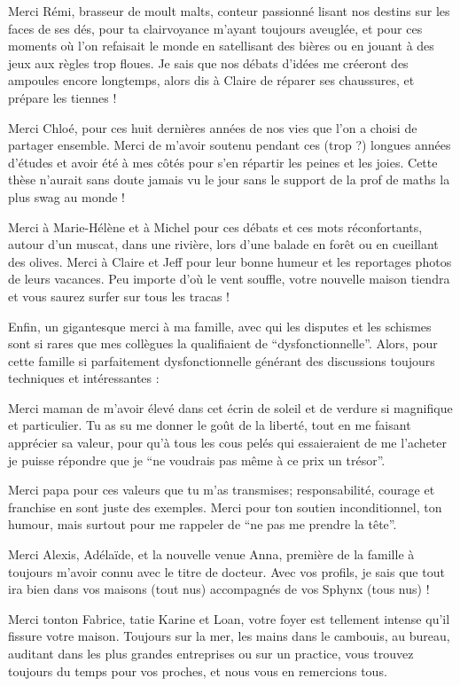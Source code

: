 \documentclass[english,a4paper,11pt,twoside]{StyleThese}
\begin{document}
Merci Rémi, brasseur de moult malts, conteur passionné lisant nos destins sur les faces de ses dés, pour ta clairvoyance m'ayant toujours aveuglée, et pour ces moments où l'on refaisait le monde en satellisant des bières ou en jouant à des jeux aux règles trop floues. Je sais que nos débats d'idées me créeront des ampoules encore longtemps, alors dis à Claire de réparer ses chaussures, et prépare les tiennes !

\medskip

Merci Chloé, pour ces huit dernières années de nos vies que l'on a choisi de partager ensemble. Merci de m'avoir soutenu pendant ces (trop ?) longues années d'études et avoir été à mes côtés pour s'en répartir les peines et les joies. Cette thèse n'aurait sans doute jamais vu le jour sans le support de la prof de maths la plus swag au monde !

Merci à Marie-Hélène et à Michel pour ces débats et ces mots réconfortants, autour d'un muscat, dans une rivière, lors d'une balade en forêt ou en cueillant des olives. Merci à Claire et Jeff pour leur bonne humeur et les reportages photos de leurs vacances. Peu importe d'où le vent souffle, votre nouvelle maison tiendra et vous saurez surfer sur tous les tracas !

\smallskip

Enfin, un gigantesque merci à ma famille, avec qui les disputes et les schismes sont si rares que mes collègues la qualifiaient de ``dysfonctionnelle''. Alors, pour cette famille si parfaitement dysfonctionnelle générant des discussions toujours techniques et intéressantes :

Merci maman de m'avoir élevé dans cet écrin de soleil et de verdure si magnifique et particulier. Tu as su me donner le goût de la liberté, tout en me faisant apprécier sa valeur, pour qu'à tous les cous pelés qui essaieraient de me l'acheter je puisse répondre que je ``ne voudrais pas même à ce prix un trésor''. 

Merci papa pour ces valeurs que tu m'as transmises; responsabilité, courage et franchise en sont juste des exemples. Merci pour ton soutien inconditionnel, ton humour, mais surtout pour me rappeler de ``ne pas me prendre la tête''. 

Merci Alexis, Adélaïde, et la nouvelle venue Anna, première de la famille à toujours m'avoir connu avec le titre de docteur. Avec vos profils, je sais que tout ira bien dans vos maisons (tout nus) accompagnés de vos Sphynx (tous nus) !

Merci tonton Fabrice, tatie Karine et Loan, votre foyer est tellement intense qu'il fissure votre maison. Toujours sur la mer, les mains dans le cambouis, au bureau, auditant dans les plus grandes entreprises ou sur un practice, vous trouvez toujours du temps pour vos proches, et nous vous en remercions tous.
\end{document}
